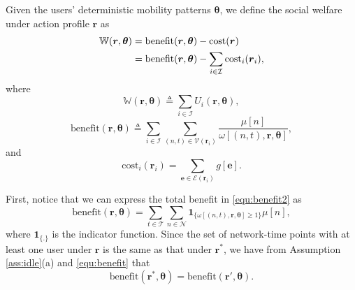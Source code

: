 \documentclass[journal]{IEEEtran}
\newcommand{\mc}[1]{\mathcal{#1}}
\newcommand{\bs}[1]{\boldsymbol{#1}}
\begin{document}
  Given the users' deterministic mobility patterns $\boldsymbol{\theta}$, we define the social welfare under action profile $\boldsymbol{r}$ as
%
\begin{equation} \label{equ:surplus}
\begin{split}
	\mathbb{W}(\boldsymbol{r},\boldsymbol{\theta})
	= \text{benefit}(\boldsymbol{r},\boldsymbol{\theta}) - \text{cost}(\boldsymbol{r}) \hspace{0.9cm} \\
	= \text{benefit}(\boldsymbol{r},\boldsymbol{\theta}) - \sum_{i \in \mathcal{I}} \text{cost}_i(\bs{r}_i),
\end{split}	
\end{equation}
%	
where
%
\begin{equation}
	\mathbb{W}(\boldsymbol{r},\boldsymbol{\theta}) 
	\triangleq \sum_{i \in \mc{I}} U_i(\boldsymbol{r},\boldsymbol{\theta}), 
\end{equation}
% 
%
\begin{equation} \label{equ:benefit2}
	\text{benefit}(\boldsymbol{r},\boldsymbol{\theta}) \triangleq  \sum_{i \in \mc{I}} \sum_{(n,t) \in \mc{V}(\boldsymbol{r}_i)} \frac{\mu[n]}{\omega[(n, t), \boldsymbol{r}, \boldsymbol{\theta}]}, %
\end{equation}
% 
and
%
\begin{equation}
	\text{cost}_i(\bs{r}_i) = \sum_{\boldsymbol{e} \in \mathcal{E}(\boldsymbol{r}_i)} g[\boldsymbol{e}]. %
\end{equation}
% 

	
	First, notice that we can express the total benefit in \eqref{equ:benefit2} as
%
\begin{equation} \label{equ:benefit}
	\text{benefit}(\boldsymbol{r}, \boldsymbol{\theta}) = \sum_{t \in \mathcal{T}} \sum_{n \in \mathcal{N}} \textbf{1}_{\{\omega[(n, t), \boldsymbol{r}, \boldsymbol{\theta}] \geq 1 \}} \mu[n],
\end{equation}
%	
where $\textbf{1}_{\{.\}}$ is the indicator function.
  Since the set of network-time points with at least one user under $\boldsymbol{r}$ is the same as that under $\boldsymbol{r}^*$,  we have from Assumption \ref{ass:idle}(a) and \eqref{equ:benefit} that 
%
\begin{equation} \label{equ:benefit_derive}
	\text{benefit}(\boldsymbol{r}^*, \boldsymbol{\theta}) = \text{benefit}(\boldsymbol{r}', \boldsymbol{\theta}).
\end{equation}
%	
  
\end{document}
